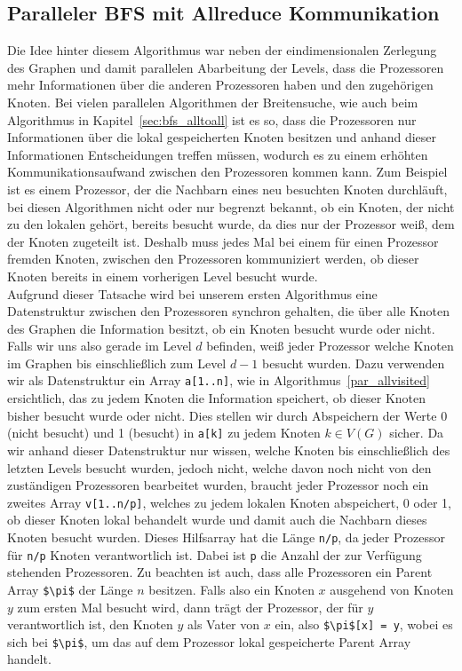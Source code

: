 \documentclass[11pt,a4paper]{article}
\begin{document}
\subsection{Paralleler BFS mit Allreduce Kommunikation}
\label{sec:bfs_allreduce}
Die Idee hinter diesem Algorithmus war neben der eindimensionalen Zerlegung des Graphen und damit parallelen Abarbeitung der Levels, dass die Prozessoren mehr Informationen über die anderen Prozessoren haben und den zugehörigen Knoten. Bei vielen parallelen Algorithmen der Breitensuche, wie auch beim Algorithmus in Kapitel~\ref{sec:bfs_alltoall} ist es so, dass die Prozessoren nur Informationen über die lokal gespeicherten Knoten besitzen und anhand dieser Informationen Entscheidungen treffen müssen, wodurch es zu einem erhöhten Kommunikationsaufwand zwischen den Prozessoren kommen kann. Zum Beispiel ist es einem Prozessor, der die Nachbarn eines neu besuchten Knoten durchläuft, bei diesen Algorithmen nicht oder nur begrenzt bekannt, ob ein Knoten, der nicht zu den lokalen gehört, bereits besucht wurde, da dies nur der Prozessor weiß, dem der Knoten zugeteilt ist. Deshalb muss jedes Mal bei einem für einen Prozessor fremden Knoten, zwischen den Prozessoren kommuniziert werden, ob dieser Knoten bereits in einem vorherigen Level besucht wurde.\\
Aufgrund dieser Tatsache wird bei unserem ersten Algorithmus eine Datenstruktur zwischen den Prozessoren synchron gehalten, die über alle Knoten des Graphen die Information besitzt, ob ein Knoten besucht wurde oder nicht. Falls wir uns also gerade im Level \(d\) befinden, weiß jeder Prozessor welche Knoten im Graphen bis einschließlich zum Level \(d-1\) besucht wurden. Dazu verwenden wir als Datenstruktur ein Array \lstinline{a[1..n]}, wie in Algorithmus~\ref{par_allvisited} ersichtlich, das zu jedem Knoten die Information speichert, ob dieser Knoten bisher besucht wurde oder nicht. Dies stellen wir durch Abspeichern der Werte 0 (nicht besucht) und 1 (besucht) in \lstinline{a[k]} zu jedem Knoten \(k \in V(G)\) sicher. Da wir anhand dieser Datenstruktur nur wissen, welche Knoten bis einschließlich des letzten Levels besucht wurden, jedoch nicht, welche davon noch nicht von den zuständigen Prozessoren bearbeitet wurden, braucht jeder Prozessor noch ein zweites Array \lstinline{v[1..n/p]}, welches zu jedem lokalen Knoten abspeichert, 0 oder 1, ob dieser Knoten lokal behandelt wurde und damit auch die Nachbarn dieses Knoten besucht wurden. Dieses Hilfsarray hat die Länge \lstinline{n/p}, da jeder Prozessor für \lstinline{n/p} Knoten verantwortlich ist. Dabei ist \lstinline{p} die Anzahl der zur Verfügung stehenden Prozessoren. Zu beachten ist auch, dass alle Prozessoren ein Parent Array \lstinline{$\pi$} der Länge \(n\) besitzen. Falls also ein Knoten \(x\) ausgehend von Knoten \(y\) zum ersten Mal besucht wird, dann trägt der Prozessor, der für \(y\) verantwortlich ist, den Knoten \(y\) als Vater von \(x\) ein, also \lstinline{$\pi$[x] = y}, wobei es sich bei \lstinline{$\pi$}, um das auf dem Prozessor lokal gespeicherte Parent Array handelt.
\end{document}
